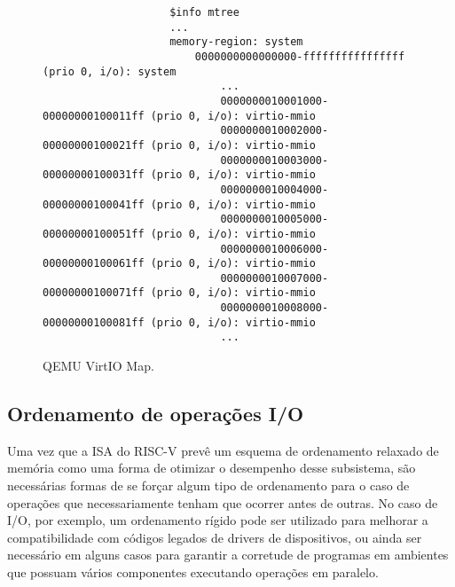 		\begin{figure}[bt]
			\begin{commandline}
				\begin{verbatim}
					$info mtree
					...
					memory-region: system
					    0000000000000000-ffffffffffffffff (prio 0, i/o): system
					        ...
					        0000000010001000-00000000100011ff (prio 0, i/o): virtio-mmio
					        0000000010002000-00000000100021ff (prio 0, i/o): virtio-mmio
					        0000000010003000-00000000100031ff (prio 0, i/o): virtio-mmio
					        0000000010004000-00000000100041ff (prio 0, i/o): virtio-mmio
					        0000000010005000-00000000100051ff (prio 0, i/o): virtio-mmio
					        0000000010006000-00000000100061ff (prio 0, i/o): virtio-mmio
					        0000000010007000-00000000100071ff (prio 0, i/o): virtio-mmio
					        0000000010008000-00000000100081ff (prio 0, i/o): virtio-mmio
					        ...
				\end{verbatim}
			\end{commandline}
			\caption{QEMU VirtIO Map.}
		\end{figure}


	\subsection*{Ordenamento de operações I/O}

		Uma vez que a ISA do RISC-V prevê um esquema de ordenamento relaxado de memória como
		uma forma de otimizar o desempenho desse subsistema, são necessárias formas de se forçar
		algum tipo de ordenamento para o caso de operações que necessariamente tenham que ocorrer
		antes de outras. No caso de I/O, por exemplo, um ordenamento rígido pode ser utilizado
		para melhorar a compatibilidade com códigos legados de drivers de dispositivos, ou ainda
		ser necessário em alguns casos para garantir a corretude de programas em ambientes que
		possuam vários componentes executando operações em paralelo.

